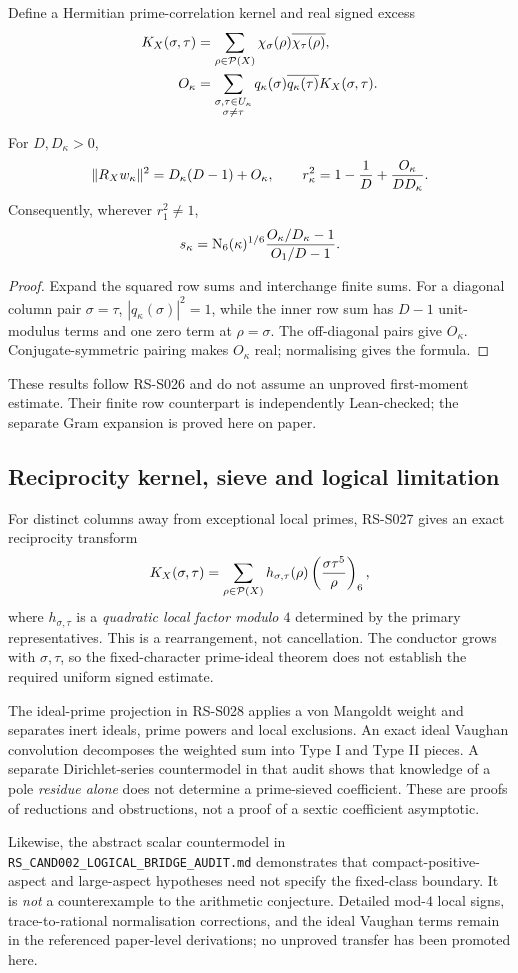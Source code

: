 Define a Hermitian prime-correlation kernel and real signed excess
\begin{align*}
 K_X(\sigma,\tau)
   &=\sum_{\rho\in\mathcal P(X)}
          \chi_\sigma(\rho)\overline{\chi_\tau(\rho)},\\
 O_\kappa
   &=\sum_{\substack{\sigma,\tau\in U_\kappa\\\sigma\ne\tau}}
      q_\kappa(\sigma)\overline{q_\kappa(\tau)}
         K_X(\sigma,\tau).
\end{align*}
\begin{proposition}\label{prop:gram}
For \(D,D_\kappa>0\),
\[
 \|R_X w_\kappa\|^2=D_\kappa(D-1)+O_\kappa,\qquad
 r_\kappa^2=1-\frac1D+\frac{O_\kappa}{DD_\kappa}.
\]
Consequently, wherever \(r_1^2\ne1\),
\[
 s_\kappa=\operatorname{N}_6(\kappa)^{1/6}
 \frac{O_\kappa/D_\kappa-1}{O_1/D-1}.
\]
\end{proposition}
\begin{proof}
Expand the squared row sums and interchange finite sums.
For a diagonal column pair \(\sigma=\tau\),
\(|q_\kappa(\sigma)|^2=1\), while the
inner row sum has \(D-1\) unit-modulus terms
and one zero term at \(\rho=\sigma\).
The off-diagonal pairs give \(O_\kappa\).
Conjugate-symmetric pairing makes \(O_\kappa\) real;
normalising gives the formula.
\end{proof}
These results follow RS-S026 and do not assume an
unproved first-moment estimate. Their finite row
counterpart is independently Lean-checked;
the separate Gram expansion is proved here on paper.

\subsection{Reciprocity kernel, sieve and logical limitation}
For distinct columns away from exceptional local primes,
RS-S027 gives an exact reciprocity transform
\[
 K_X(\sigma,\tau)
  =\sum_{\rho\in\mathcal P(X)}
       h_{\sigma,\tau}(\rho)
       \left(\frac{\sigma\tau^5}{\rho}\right)_6,
\]
where \(h_{\sigma,\tau}\) is a \emph{quadratic
local factor modulo \(4\)} determined by the
primary representatives. This is a rearrangement,
not cancellation. The conductor grows with
\(\sigma,\tau\), so the fixed-character prime-ideal
theorem does not establish the required
uniform signed estimate.

The ideal-prime projection in RS-S028 applies
a von Mangoldt weight and separates inert ideals,
prime powers and local exclusions. An exact ideal
Vaughan convolution decomposes the weighted
sum into Type I and Type II pieces.
A separate Dirichlet-series countermodel in
that audit shows that knowledge of a pole
\emph{residue alone} does not determine
a prime-sieved coefficient. These are proofs
of reductions and obstructions, not a proof of
a sextic coefficient asymptotic.

Likewise, the abstract scalar countermodel in
\texttt{RS\_CAND002\_LOGICAL\_BRIDGE\_AUDIT.md}
demonstrates that compact-positive-aspect and
large-aspect hypotheses need not specify the
fixed-class boundary. It is \emph{not}
a counterexample to the arithmetic conjecture.
Detailed mod-\(4\) local signs, trace-to-rational
normalisation corrections, and the ideal
Vaughan terms remain in the referenced
paper-level derivations; no unproved transfer
has been promoted here.
